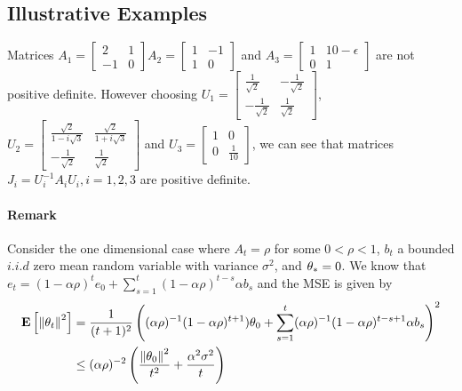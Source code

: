 \begin{itemize}[leftmargin=*, before = \leavevmode\vspace{-\baselineskip}]
\subsection{Illustrative Examples}
\begin{example}\label{ex:pdas}
Matrices $A_1=\begin{bmatrix} 2 &1 \\-1 &0\end{bmatrix}$$A_2=\begin{bmatrix}1 & -1\\ 1 &0 \end{bmatrix}$ and $A_3=\begin{bmatrix} 1 & 10-\epsilon \\ 0 &1 \end{bmatrix}$ are not positive definite. However choosing $U_1=\begin{bmatrix} \frac{1}{\sqrt{2}}& -\frac{1}{\sqrt{2}}\\ -\frac{1}{\sqrt{2}} &\frac{1}{\sqrt{2}} \end{bmatrix}$, $U_2=\begin{bmatrix} \frac{\sqrt{2}}{1-i\sqrt{3}} & \frac{\sqrt{2}}{1+i\sqrt{3}} \\ -\frac{1}{\sqrt{2}} &\frac{1}{\sqrt{2}}\end{bmatrix}$ and $U_3=\begin{bmatrix} 1 & 0\\ 0 &\frac{1}{10} \end{bmatrix}$, we can see that matrices $J_i=U_i^{-1}A_i U_i,i=1,2,3$ are positive definite.
\end{example}
\paragraph{Remark}

\begin{example}\label{ex:geo}
Consider the one dimensional case where $A_t=\rho$ for some $0<\rho<1$, $b_t$ a bounded $i.i.d$ zero mean random variable with variance $\sigma^2$, and $\theta_*=0$. We know that $e_t=(1-\alpha\rho)^t e_0+\sum_{s=1}^t (1-\alpha \rho)^{t-s}\alpha b_s$ and the MSE is given by
\begin{align*}
\mathbf{E}\left[\left\| \theta_t\right\|^2\right]&=\frac{1}{(t+1)^2}\left( (\alpha\rho)^{-1}(1-\alpha\rho)^{t+1}) \theta_0+ \sum_{s=1}^t (\alpha\rho)^{-1}(1-\alpha \rho)^{t-s+1} \alpha b_s\right)^2\\
&\leq (\alpha\rho)^{-2}\left(\frac{\left\| \theta_0\right\|^2}{t^2}+\frac{\alpha^2\sigma^2}{t}\right)
\end{align*}
\end{example}

\end{itemize}
